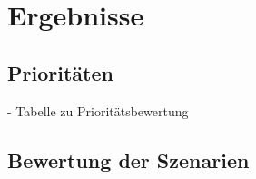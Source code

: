 
\chapter{Ergebnisse}\label{chapter:results}

	\section{Prioritäten}
	
		- Tabelle zu Prioritätsbewertung
	
	\section{Bewertung der Szenarien}